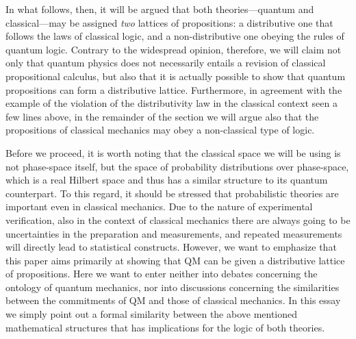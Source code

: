 \documentclass[11pt, executivepaper]{article}
\begin{document}
In what follows, then, it will be argued that both theories---quantum and classical---may be assigned \emph{two} lattices of propositions: a distributive one that follows the laws of classical logic, and a non-distributive one obeying the rules of quantum logic. Contrary to the widespread opinion, therefore, we will claim not only that quantum physics does not necessarily entails a revision of classical propositional calculus, but also that it is actually possible to show that quantum propositions can form a distributive lattice. Furthermore, in agreement with the example of the violation of the distributivity law in the classical context seen a few lines above, in the remainder of the section we will argue also that the propositions of classical mechanics may obey a non-classical type of logic. 

Before we proceed, it is worth noting that the classical space we will be using is not phase-space itself, but the space of probability distributions over phase-space, which is a real Hilbert space and thus has a similar structure to its quantum counterpart. To this regard, it should be stressed that probabilistic theories are important even in classical mechanics. Due to the nature of experimental verification, also in the context of classical mechanics there are always going to be uncertainties in the preparation and measurements, and repeated measurements will directly lead to statistical constructs.
However, we want to emphasize that this paper aims primarily at showing that QM can be given a distributive lattice of propositions. Here we want to enter neither into debates concerning the ontology of quantum mechanics, nor into discussions concerning the similarities between the commitments of QM and those of classical mechanics.  In this essay we simply point out a formal similarity between the above mentioned mathematical structures that has implications for the logic of both theories. 
\end{document}
